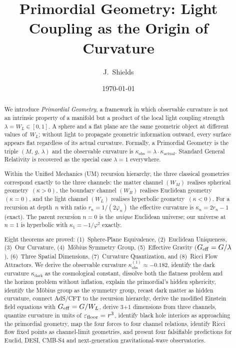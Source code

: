 \documentclass[prd,twocolumn,preprintnumbers,amsmath,amssymb]{revtex4-2}
\newcommand{\phig}{\varphi}
\newcommand{\WL}{W_{L}}
\newcommand{\WB}{W_{B}}
\newcommand{\WM}{W_{M}}
\newcommand{\kact}{\kappa_{\mathrm{actual}}}
\newcommand{\kobs}{\kappa_{\mathrm{obs}}}
\newcommand{\kdark}{\kappa_{\mathrm{dark}}}
\begin{document}
\title{Primordial Geometry: Light Coupling as the Origin of Curvature}

\author{J.~Shields}
\date{\today}

\begin{abstract}
We introduce \emph{Primordial Geometry}, a framework in which observable curvature
is not an intrinsic property of a manifold but a product of the local light
coupling strength~$\lambda = \WL \in [0,1]$.  A sphere and a flat plane are
the same geometric object at different values of~$\WL$; without light to
propagate geometric information outward, every surface appears flat regardless
of its actual curvature.  Formally, a Primordial Geometry is the triple
$(M,\,g,\,\lambda)$ and the observable curvature is $\kobs = \lambda\cdot\kact$.
Standard General Relativity is recovered as the special case $\lambda=1$
everywhere.

Within the Unified Mechanics (UM) recursion hierarchy, the three classical
geometries correspond exactly to the three channels: the matter channel
$(\WM)$ realises spherical geometry~$(\kappa>0)$, the boundary channel
$(\WB)$ realises Euclidean geometry~$(\kappa=0)$, and the light channel
$(\WL)$ realises hyperbolic geometry~$(\kappa<0)$.  For a recursion at
depth~$n$ with ratio $r_n = 1/(2\phig_n)$ the effective curvature is
$\kappa_n = 2r_n - 1$ (exact).  The parent recursion $n=0$ is the
\emph{unique} Euclidean universe; our universe at $n=1$ is hyperbolic with
$\kappa_1 = -1/\phig^2$ exactly.

Eight theorems are proved: (1)~Sphere-Plane Equivalence, (2)~Euclidean Uniqueness,
(3)~Our Curvature, (4)~Möbius Symmetry Group, (5)~Effective Gravity ($G_{\rm eff}
= G/\lambda$), (6)~Three Spatial Dimensions, (7)~Curvature Quantization, and
(8)~Ricci Flow Attractors.  We derive the observable curvature
$\kobs^{(1)}\approx -0.182$, identify the dark curvature $\kdark$ as the
cosmological constant, dissolve both the flatness problem and the horizon problem
without inflation, explain the primordial's hidden sphericity, identify the
Möbius group as the symmetry group, recast dark matter as hidden curvature,
connect AdS/CFT to the recursion hierarchy, derive the modified Einstein field
equations with $G_{\rm eff} = G/\WL$, derive 3+1 dimensions from three channels,
quantize curvature in units of $\varepsilon_{\rm floor} = r^3$, identify black
hole interiors as approaching the primordial geometry, map the four forces to four
channel relations, identify Ricci flow fixed points as channel-limit geometries,
and present four falsifiable predictions for Euclid, DESI, CMB-S4 and
next-generation gravitational-wave observatories.
\end{abstract}
\end{document}

